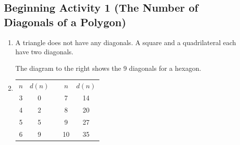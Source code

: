 \documentclass[11pt]{article}
\begin{document}
\subsection*{Beginning Activity 1 (The Number of Diagonals of a Polygon)}
\begin{enumerate}
\item A triangle does not have any diagonals.  A square and a quadrilateral each have two diagonals.
\begin{minipage}{3in}
The diagram to the right shows the 9 diagonals for a hexagon.
\one
\end{minipage}
\begin{minipage}{2in}
\begin{center}
\end{center}
\end{minipage}


\item \begin{multicols}{2}
\begin{tabular}[t]{| c | c | c | c | c |} \cline{1-2} \cline{4-5}
$n$ &  $d ( n )$ &  & $n$ & $d ( n )$   \\ \cline{1-2} \cline{4-5}
3  &  0  &  & 7  &  14  \\ \cline{1-2} \cline{4-5}
4  &  2  &  & 8  &  20  \\ \cline{1-2} \cline{4-5}
5  &  5  &  & 9  &  27  \\ \cline{1-2} \cline{4-5}
6  &  9  &  & 10 &  35  \\ \cline{1-2} \cline{4-5}
\end{tabular}


\end{multicols}
\end{enumerate}
\end{document}

